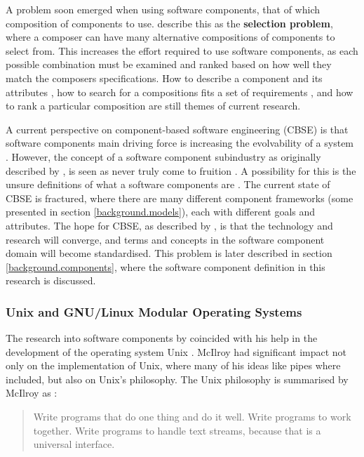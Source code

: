 A problem soon emerged when using software components, that of which composition of components to use.
\cite{PrietoDiaz1987} describe this as the \textbf{selection problem}, where a composer can have many alternative compositions of components to select from.
This increases the effort required to use software components, as each possible combination must be examined and ranked based on how well they match the composers specifications.
How to describe a component and its attributes \citep{treinen2009common,Xinjuan2007},
how to search for a compositions fits a set of requirements \citep{abate2011,Kwong2010,treinen2009,DeAlmeida2004}, 
and how to rank a particular composition \citep{Chen2011,Aleti2009} are still themes of current research.

A current perspective on component-based software engineering (CBSE) is that software components main driving force is increasing the evolvability of a system \citep{Szyperski2000}.
However, the concept of a software component subindustry as originally described by \cite{McIlroy1969}, is seen as never truly come to fruition \cite{Szyperski2002}.
A possibility for this is the unsure definitions of what a software components are \citep{Crnkovic2011}.
The current state of CBSE is fractured, where there are many different component frameworks (some presented in section \ref{background.models}),
each with different goals and attributes.
The hope for CBSE, as described by \cite{Crnkovic2011}, is that the technology and research will converge, and terms and concepts in the software component domain will become standardised.
This problem is later described in section \ref{background.components}, where the software component definition in this research is discussed.

\subsubsection{Unix and GNU/Linux Modular Operating Systems}
The research into software components by \cite{McIlroy1969} coincided with his help in the development of the operating system Unix \citep{raymond2003art}. 
McIlroy had significant impact not only on the implementation of Unix, where many of his ideas like pipes where included,
but also on Unix's philosophy. 
The Unix philosophy is summarised by McIlroy as \citep{Salus1994}:
\begin{quote}
Write programs that do one thing and do it well. Write programs to work together. 
Write programs to handle text streams, because that is a universal interface.
\end{quote}

